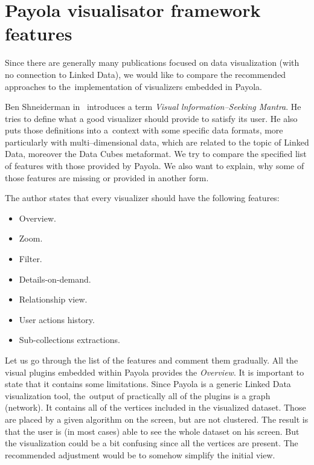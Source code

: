 \section{Payola visualisator framework features}
Since there are generally many publications focused on data visualization (with no
connection to Linked Data), we would like to compare the recommended approaches to
the~implementation of visualizers embedded in Payola.

Ben Shneiderman in~\cite{mantra} introduces a term \emph{Visual lnformation--Seeking Mantra}.
He tries to define
what a good visualizer should provide to satisfy its user. He also puts those definitions into
a~context with some specific data formats, more particularly with multi--dimensional data,
which are related to the topic of Linked Data, moreover the Data Cubes metaformat. We try to
compare the specified list of features with those provided by Payola. We also want to explain,
why some of those features are missing or provided in another form.

The author states that every visualizer should have the following features:

\begin{itemize}
\item Overview.
\item Zoom.
\item Filter.
\item Details-on-demand.
\item Relationship view.
\item User actions history.
\item Sub-collections extractions.
\end{itemize}

Let us go through the list of the features and comment them gradually. All the visual plugins
embedded within Payola provides the \emph{Overview}. It is important to state
that it contains some limitations. Since Payola is a generic Linked Data visualization tool,
the~output of practically all of the plugins is a graph (network). It contains all of the vertices
included in the visualized dataset. Those are placed by a given algorithm on the screen,
but are not clustered. The result is that the user is (in most cases) able to see the whole
dataset on his screen. But the visualization could be a bit confusing since all the vertices
are present. The recommended adjustment would be to somehow simplify the initial view.

